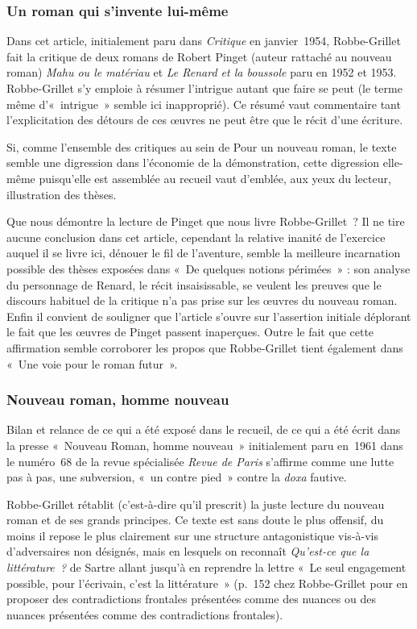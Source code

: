 \subsubsection{Un roman qui s'invente lui-même}
Dans cet article, initialement paru dans \textit{Critique} en janvier~1954, Robbe-Grillet fait la critique de deux romans de Robert Pinget (auteur rattaché au nouveau roman) \textit{Mahu ou le matériau} et \textit{Le Renard et la boussole} paru en 1952 et 1953. Robbe-Grillet s'y emploie à résumer l'intrigue autant que faire se peut (le terme même d'«~intrigue~» semble ici inapproprié). Ce résumé vaut commentaire tant l'explicitation des détours de ces œuvres ne peut être que le récit d'une écriture.

Si, comme l'ensemble des critiques au sein de Pour un nouveau roman, le texte semble une digression dans l'économie de la démonstration, cette digression elle-même puisqu'elle est assemblée au recueil vaut d'emblée, aux yeux du lecteur, illustration des thèses.

Que nous démontre la lecture de Pinget que nous livre Robbe-Grillet~? Il ne tire aucune conclusion dans cet article, cependant la relative inanité de l'exercice auquel il se livre ici, dénouer le fil de l'aventure, semble la meilleure incarnation possible des thèses exposées dans «~De quelques notions périmées~» : son analyse du personnage de Renard, le récit insaisissable, se veulent les preuves que le discours habituel de la critique n'a pas prise sur les œuvres du nouveau roman. Enfin il convient de souligner que l'article s'ouvre sur l'assertion initiale déplorant le fait que les œuvres de Pinget passent inaperçues. Outre le fait que cette affirmation semble corroborer les propos que Robbe-Grillet tient également dans «~Une voie pour le roman futur~».
	



\subsubsection{Nouveau roman, homme nouveau}
Bilan et relance de ce qui a été exposé dans le recueil, de ce qui a été écrit dans la presse «~Nouveau Roman, homme nouveau~» initialement paru en~1961 dans le numéro~68 de la revue spécialisée \textit{Revue de Paris} s'affirme comme une lutte pas à pas, une subversion, «~un contre pied~» contre la \textit{doxa} fautive.

Robbe-Grillet rétablit (c'est-à-dire qu'il prescrit) la juste lecture du nouveau roman et de ses grands principes. Ce texte est sans doute le plus offensif, du moins il repose le plus clairement sur une structure antagonistique vis-à-vis d'adversaires non désignés, mais en lesquels on reconnaît \textit{Qu'est-ce que la littérature~?} de Sartre allant jusqu'à en reprendre la lettre «~Le seul engagement possible, pour l'écrivain, c'est la littérature~» (p.~152 chez Robbe-Grillet pour en proposer des contradictions frontales présentées comme des nuances ou des nuances présentées comme des contradictions frontales).


